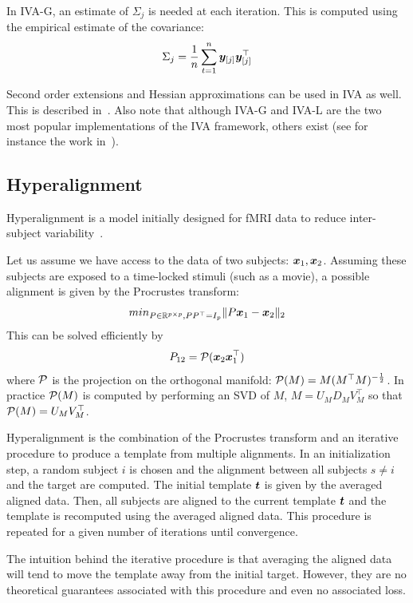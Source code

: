 In IVA-G, an estimate of $\Sigma_j$ is needed at each iteration. This is
computed using the empirical estimate of the covariance:
\begin{align}
\Sigma_j = \frac1{n} \sum_{t=1}^n \boldsymbol{y}_{[j]} \boldsymbol{y}_{[j]}^{\top}
\end{align}

Second order extensions and Hessian approximations can be used in IVA as well.
This is described in~\cite{anderson2011joint}. Also note that although IVA-G and
IVA-L are the two most popular implementations of the IVA framework, others exist
(see for instance the work in~\cite{anderson2013independent}).

\subsection{Hyperalignment}
Hyperalignment is a model initially designed for fMRI data to reduce
inter-subject variability~\cite{haxby2011common}.

Let us assume we have access to the data of two subjects: $\boldsymbol{x}_1, \boldsymbol{x}_2$.
Assuming these subjects are exposed to a time-locked stimuli (such as a movie), a possible alignment is given by the Procrustes transform:
\begin{align}
min_{P \in \mathbb{R}^{p \times p}, PP^{\top} = I_p} \|P \boldsymbol{x}_1 - \boldsymbol{x}_2 \|_2
\end{align}
This can be solved efficiently by
\begin{align}
  P_{12} = \mathcal{P}(\boldsymbol{x}_2 \boldsymbol{x}_1^{\top})
\end{align}
where $\mathcal{P}$ is the projection on the orthogonal manifold: $\mathcal{P}(M) = M
(M^{\top}M)^{-\frac12}$. In practice $\mathcal{P}(M)$ is computed by performing an SVD
of $M$, $M = U_M D_M V_M^{\top} $ so that $\mathcal{P}(M) = U_M V_M^{\top}$.

Hyperalignment is the combination of the Procrustes transform and an iterative
procedure to produce a template from multiple alignments.
In an initialization step, a random subject $i$ is chosen and the alignment
between all subjects $s \neq i$ and the target are computed. The initial
template $\boldsymbol{t}$ is given by the averaged aligned data. Then, all subjects are
aligned to the current template $\boldsymbol{t}$ and the template is recomputed using the
averaged aligned data. This procedure is repeated for a given number of
iterations until convergence.

The intuition behind the iterative procedure is that averaging the aligned data
will tend to move the template away from the initial target. However, they are
no theoretical guarantees associated with this procedure and even no associated loss.

